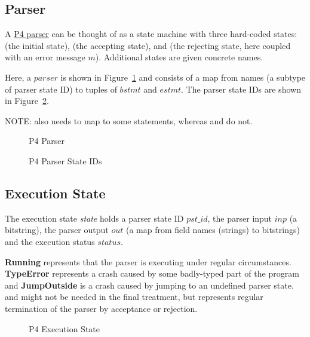 \documentclass[UTF8]{article}
\begin{document}
\newpage
\subsection{Parser}
A \href{https://p4.org/p4-spec/docs/P4-16-v1.2.1.html#sec-packet-parsing}{P4 parser} can be thought of as a state machine with three hard-coded states: \start{} (the initial state), \accept{} (the accepting state), and  (the rejecting state, here coupled with an error message $m$). Additional states are given concrete names.

Here, a $\mathit{parser}$ is shown in Figure~\ref{fig:parser} and consists of a map from names (a subtype of parser state ID) to tuples of $\mathit{bstmt}$ and $\mathit{estmt}$. The parser state IDs are shown in Figure~\ref{fig:pst_id}.

{\color{red} NOTE: \start{} also needs to map to some statements, whereas \accept{} and  do not.}

\begin{figure}[h!]
\centering\ottgrammartabular{
\ottparser\ottafterlastrule
}
\caption{P4 Parser}
\label{fig:parser}
\end{figure}

\begin{figure}[h!]
\centering\ottgrammartabular{
\ottpstXXid\ottafterlastrule
}
\caption{P4 Parser State IDs}
\label{fig:pst_id}
\end{figure}

\newpage
\newcommand{\state}{\textit{state}}
\subsection{Execution State}
The execution state \state{} holds a parser state ID $\textit{pst\_id}$, the parser input $\textit{inp}$ (a bitstring), the parser output $\textit{out}$ (a map from field names (strings) to bitstrings) and the execution status $\textit{status}$.

\textbf{Running} represents that the parser is executing under regular circumstances. \textbf{TypeError} represents a crash caused by some badly-typed part of the program and \textbf{JumpOutside} is a crash caused by jumping to an undefined parser state. \accept{} and  might not be needed in the final treatment, but represents regular termination of the parser by acceptance or rejection.

\begin{figure}[h!]
\centering\ottgrammartabular{
\ottstatus\ottinterrule
\ottstate\ottafterlastrule
}
\caption{P4 Execution State}
\label{fig:status}
\end{figure}
\end{document}
